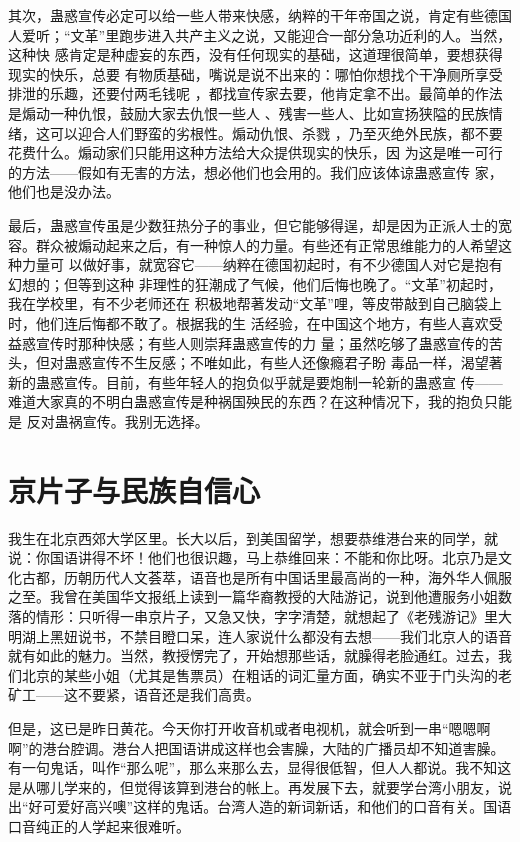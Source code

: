 其次，蛊惑宣传必定可以给一些人带来快感，纳粹的干年帝国之说，肯定有些德国 人爱听；“文革”里跑步进入共产主义之说，又能迎合一部分急功近利的人。当然，这种快 感肯定是种虚妄的东西，没有任何现实的基础，这道理很简单，要想获得现实的快乐，总要 有物质基础，嘴说是说不出来的：哪怕你想找个干净厕所享受排泄的乐趣，还要付两毛钱呢 ，都找宣传家去要，他肯定拿不出。最简单的作法是煽动一种仇恨，鼓励大家去仇恨一些人 、残害一些人、比如宣扬狭隘的民族情绪，这可以迎合人们野蛮的劣根性。煽动仇恨、杀戮 ，乃至灭绝外民族，都不要花费什么。煽动家们只能用这种方法给大众提供现实的快乐，因 为这是唯一可行的方法——假如有无害的方法，想必他们也会用的。我们应该体谅蛊惑宣传 家，他们也是没办法。 


最后，蛊惑宣传虽是少数狂热分子的事业，但它能够得逞，却是因为正派人士的宽 容。群众被煽动起来之后，有一种惊人的力量。有些还有正常思维能力的人希望这种力量可 以做好事，就宽容它——纳粹在德国初起时，有不少德国人对它是抱有幻想的；但等到这种 非理性的狂潮成了气候，他们后悔也晚了。“文革”初起时，我在学校里，有不少老师还在 积极地帮著发动“文革”哩，等皮带敲到自己脑袋上时，他们连后悔都不敢了。根据我的生 活经验，在中国这个地方，有些人喜欢受益惑宣传时那种快感；有些人则崇拜蛊惑宣传的力 量；虽然吃够了蛊惑宣传的苦头，但对蛊惑宣传不生反感；不唯如此，有些人还像瘾君子盼 毒品一样，渴望著新的蛊惑宣传。目前，有些年轻人的抱负似乎就是要炮制一轮新的蛊惑宣 传——难道大家真的不明白蛊惑宣传是种祸国殃民的东西？在这种情况下，我的抱负只能是 反对蛊祸宣传。我别无选择。

\chapter{京片子与民族自信心}

我生在北京西郊大学区里。长大以后，到美国留学，想要恭维港台来的同学，就说：你国语讲得不坏！他们也很识趣，马上恭维回来：不能和你比呀。北京乃是文化古都，历朝历代人文荟萃，语音也是所有中国话里最高尚的一种，海外华人佩服之至。我曾在美国华文报纸上读到一篇华裔教授的大陆游记，说到他遭服务小姐数落的情形：只听得一串京片子，又急又快，字字清楚，就想起了《老残游记》里大明湖上黑妞说书，不禁目瞪口呆，连人家说什么都没有去想——我们北京人的语音就有如此的魅力。当然，教授愣完了，开始想那些话，就臊得老脸通红。过去，我们北京的某些小姐（尤其是售票员）在粗话的词汇量方面，确实不亚于门头沟的老矿工——这不要紧，语音还是我们高贵。 

但是，这已是昨日黄花。今天你打开收音机或者电视机，就会听到一串“嗯嗯啊啊”的港台腔调。港台人把国语讲成这样也会害臊，大陆的广播员却不知道害臊。有一句鬼话，叫作“那么呢”，那么来那么去，显得很低智，但人人都说。我不知这是从哪儿学来的，但觉得该算到港台的帐上。再发展下去，就要学台湾小朋友，说出“好可爱好高兴噢”这样的鬼话。台湾人造的新词新话，和他们的口音有关。国语口音纯正的人学起来很难听。 

